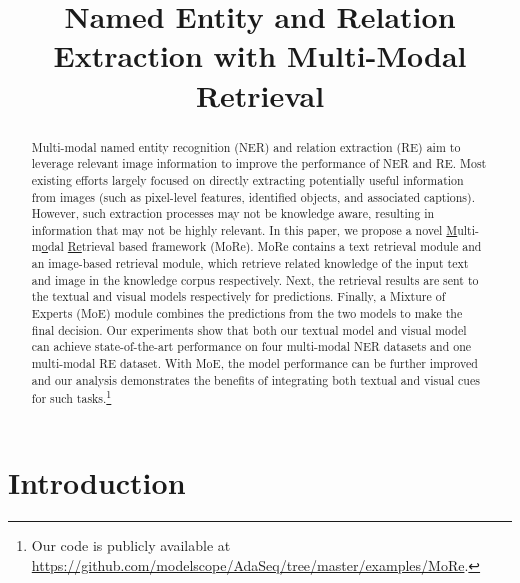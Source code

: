 \documentclass[11pt]{article}
\title{Named Entity and Relation Extraction with Multi-Modal Retrieval}
\author{Xinyu Wang$^{\diamondsuit\ddagger}$, Jiong Cai$^{\diamondsuit\ddagger}$, Yong Jiang$^{\ast}$, Pengjun Xie, 
\textbf{Kewei Tu$^{\diamondsuit}$\thanks{\hspace{1mm} Yong Jiang and Kewei Tu are the corresponding authors. $^{\ddagger}$: equal contributions. This work was done when Xinyu Wang was visiting StatNLP Research Group at SUTD.}, \and Wei Lu$^\clubsuit$} \\
 $^\diamondsuit$School of Information Science and Technology, ShanghaiTech University \\
 Shanghai Engineering Research Center of Intelligent Vision and Imaging \\
 Shanghai Institute of Microsystem and Information Technology, Chinese Academy of Sciences \\
 University of Chinese Academy of Sciences \\
 $^\clubsuit$StatNLP Research Group, Singapore University of Technology and Design \\
  {\tt \{wangxy1,caijiong,tukw\}@shanghaitech.edu.cn} \\
  {\tt \{jiangyong.ml,xpjandy\}@gmail.com} \\
  {\tt luwei@sutd.edu.sg} \\
}
\begin{document}
\maketitle


\begin{abstract}
Multi-modal named entity recognition (NER) and relation extraction (RE) aim to leverage relevant image information to improve the performance of NER and RE. 
Most existing efforts largely focused on directly extracting potentially useful information from images (such as pixel-level features, identified objects, and associated captions).
However, such extraction processes may not be knowledge aware, resulting in information that may not be highly relevant.
In this paper, we propose a novel \underline{M}ulti-m\underline{o}dal \underline{Re}trieval based framework (MoRe).
MoRe contains a text retrieval module and an image-based retrieval module, which retrieve related knowledge of the input text and image in the knowledge corpus respectively.
Next, the retrieval results are sent to the textual and visual models respectively for predictions.
Finally, a Mixture of Experts (MoE) module combines the predictions from the two models to make the final decision.
Our experiments show that both our textual model and visual model can achieve state-of-the-art performance on four multi-modal NER datasets and one multi-modal RE dataset.
With MoE, the model performance can be further improved and our analysis demonstrates the benefits of integrating both textual and visual cues for such tasks.\footnote{Our code is publicly available at \url{https://github.com/modelscope/AdaSeq/tree/master/examples/MoRe}.} \end{abstract}

\section{Introduction}
\end{document}

